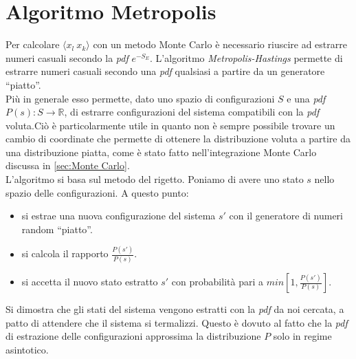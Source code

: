 \section{Algoritmo Metropolis}
Per calcolare $\langle x_l \ x_k \rangle $ con un metodo Monte Carlo è necessario riuscire ad estrarre numeri casuali secondo la \emph{pdf} $ e^{-S_E}$.
L'algoritmo \emph{Metropolis-Hastings} permette di estrarre numeri casuali secondo una \emph{pdf} qualsiasi a partire da un generatore ``piatto''.\\
Più in generale esso permette, dato uno spazio di configurazioni $S$ e una \emph{pdf} $ P(s) : S \rightarrow \mathbb{R}$, di estrarre
configurazioni del sistema compatibili con la \emph{pdf} voluta.Ciò è particolarmente utile in quanto non è sempre possibile trovare un cambio
di coordinate che permette di ottenere la distribuzione voluta a partire da una distribuzione piatta,
come è stato fatto nell'integrazione Monte Carlo discussa in \ref{sec:Monte Carlo}.\\
L'algoritmo si basa sul metodo del rigetto. Poniamo di avere uno stato $s$ nello spazio delle configurazioni. A questo punto:
\begin{itemize}
  \item si estrae una nuova configurazione del sistema $s'$ con il generatore di numeri random ``piatto''.
  \item si calcola il rapporto $ \frac{P(s')}{P(s)}$.
  \item si accetta il nuovo stato estratto $s'$ con probabilità pari a $ min\left[ 1,\frac{P(s')}{P(s)} \right]$.
\end{itemize}
Si dimostra che gli stati del sistema vengono estratti con la \emph{pdf} da noi cercata,
a patto di attendere che il sistema si termalizzi.
Questo è dovuto al fatto che la \emph{pdf} di estrazione delle configurazioni approssima la distribuzione $P$ solo in regime asintotico.
